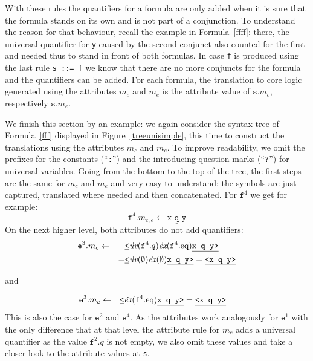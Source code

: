 With these rules the quantifiers for a formula are only added when it is sure that the formula stands on its own and is not part of a conjunction. To understand the reason for
that behaviour, recall the example in Formula~\ref{ffff}: there, the universal quantifier for \texttt{y} caused by the second conjunct also counted for the first and needed thus to stand in
front of both formulas. In case \texttt{f} is produced using the last rule \texttt{s~::=~f} we know that there are no more conjuncts for the formula and the quantifiers can be added.
For each formula, the translation to core logic generated using the attributes $m_c$ and $m_e$ is the attribute value of $\texttt{s}.m_c$, respectively $\texttt{s}.m_e$.

We finish this section by an example: we again consider the syntax tree of Formula~\ref{fff} displayed in Figure~\ref{treeunisimple}, this time to construct the translations
using the attributes $m_c$ and $m_e$. 
To improve readability, we omit  the prefixes for the constants (``\texttt{:}'') and the introducing question-marks (``\texttt{?}'') for universal variables.
Going from the bottom to the top of the tree, the first steps are the same for $m_c$ and $m_e$ and very easy to understand: the symbols are just captured, translated where needed and then concatenated.
For $\texttt{f}^4$ we get for example:
\[
 \texttt{f}^4.m_{c,e}\leftarrow \underline{\texttt{x q y}}
\]
On the next higher level, both attributes do not add quantifiers:
\begin{align*}
\notag& \texttt{e}^3.m_{c}\leftarrow& &\underline{\texttt{<}}\dot{\textit{uv}}(\texttt{f}^4.q)\dot{\textit{ex}}(\texttt{f}^4.\text{eq}) \underline{\texttt{x q y>}}\\
\notag&                             & =& \underline{\texttt{<}}\dot{\textit{uv}}(\emptyset)\dot{\textit{ex}}(\emptyset) \underline{\texttt{x q y>}}=\underline{\texttt{<x q y>}}
\end{align*}
\begin{center} and \end{center}
\begin{align*}
\notag& \texttt{e}^3.m_{e}\leftarrow& &\underline{\texttt{<}}\dot{\textit{ex}}(\texttt{f}^4.\text{eq}) \underline{\texttt{x q y>}}=\underline{\texttt{<x q y>}}
\end{align*}
This is also the case for $\texttt{e}^2$ and $\texttt{e}^4$. As the attributes work analogously for $\texttt{e}^1$ 
with the only difference that at that level the attribute rule for $m_c$
adds a universal quantifier as the value $\texttt{f}^2.q$ is not empty, we also omit these values and take a closer look to the attribute values at \texttt{s}.
